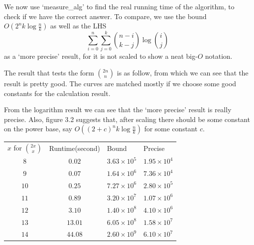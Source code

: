 \documentclass[11pt,a4paper,oneside]{article}
\begin{document}
\begin{problem}{3}
	We now use `measure\_alg' to find the real running time of the algorithm, to check if we have the correct answer. To compare, we use the bound $O(2^{n}k \log{\frac{n}{k}})$ as well as the LHS $$
	\sum_{i = 0}^{n} \sum_{j = 0}^{k} {n - i \choose k - j} \log{i \choose j} 
	$$ as a `more precise' result, for it is not scaled to show a neat big-$O$ notation.

	The result that tests the form ${2n \choose n}$ is as follow, from which we can see that the result is pretty good. The curves are matched mostly if we choose some good constants for the calculation result.

	From the logarithm result we can see that the `more precise' result is really precise. Also, figure 3.2 suggests that, after scaling there should be some constant on the power base, say $O((2+c)^{n}k \log{\frac{n}{k}})$ for some constant $c$.
	\begin{table}[htbp]
		\centering
		
		\begin{tabular}{cccc}
		\multicolumn{1}{l}{$x$ for ${2x \choose x}$} & \multicolumn{1}{l}{Runtime(second)} & \multicolumn{1}{l}{Bound} & \multicolumn{1}{l}{Precise} \\
		$               8$&$0.02$&$3.63 \times 10^{ 5 }$&$1.95 \times 10^{ 4 }$\\
		$               9$&$0.07$&$1.64 \times 10^{ 6 }$&$7.36 \times 10^{ 4 }$\\
		$               10$&$0.25$&$7.27 \times 10^{ 6 }$&$2.80 \times 10^{ 5 }$\\
		$               11$&$0.89$&$3.20 \times 10^{ 7 }$&$1.07 \times 10^{ 6 }$\\
		$               12$&$3.10$&$1.40 \times 10^{ 8 }$&$4.10 \times 10^{ 6 }$\\
		$               13$&$13.01$&$6.05 \times 10^{ 8 }$&$1.58 \times 10^{ 7 }$\\
		$               14$&$44.08$&$2.60 \times 10^{ 9 }$&$6.10 \times 10^{ 7 }$\\


\end{tabular}
\end{table}
\end{problem}
\end{document}
